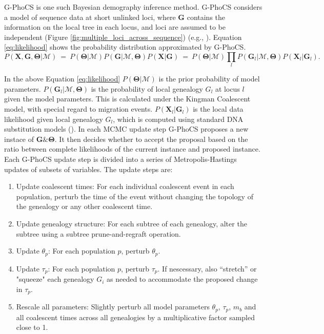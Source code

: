\documentclass[11pt]{article}
\newcommand{\vect}[1]{\boldsymbol{\mathbf{#1}}}
\newcommand{\X}{\vect{X}}
\newcommand{\M}{\mathcal{M}}
\newcommand{\G}{\vect{G}}
\newcommand{\T}{\vect{\Theta}}
\newcommand{\1}{\mathbbm{1}}
\newcommand{\gp}{G-PhoCS }
\begin{document}
\gp is one such Bayesian demography inference method. \gp considers a model of sequence data at short unlinked loci, where $\G$ contains the information on the local tree in each locus, and loci are assumed to be independent (Figure \ref{fig:multiple_loci_across_sequence}) (e.g., \cite{NIELWAKE01,RANNYANG03,GRONETAL11}).
Equation \ref{eq:likelihood} shows the probability distribution approximated by G-PhoCS.
%
\begin{equation}\label{eq:likelihood}
 P(\X,\G,\T|\M) ~=~ P(\T|\M) P(\G|\M,\T) P(\X|\G) ~=~ P(\T|\M) \prod_l P(\G_l|\M,\T) P(\X_l|\G_l).
\end{equation}

In the above Equation \ref{eq:likelihood} $P(\T|\M)$ is the prior probability of model parameters. $P(\G_l|\M,\T)$ is the probability of local genealogy $G_l$ at locus $l$ given the model parameters. This is calculated under the Kingman Coalescent model, with special regard to migration events. $P(\X_l|\G_l)$ is the local data likelihood given local genealogy $G_l$, which is computed using standard DNA substitution models (\cite{JUKECANT69}).
%
In each MCMC update step \gp proposes a new instace of $\G \& \T$. It then decides whether to accept the proposal based on the ratio between complete likelihoods of the current instance and proposed instance.
%
Each \gp update step is divided into a series of
Metropolis-Hastings updates of subsets of variables. The update steps are:

\begin{enumerate}
\item Update coalescent times: For each individual coalescent event in each population, perturb the time of the event without changing the topology of the genealogy or any other coalescent time. 

\item Update genealogy structure: For each subtree of each genealogy, alter the subtree using a subtree prune-and-regraft operation. 

\item Update $\theta_p$: For each population $p$, perturb $\theta_p$.

\item Update $\tau_p$: For each population $p$, perturb $\tau_p$. If nescessary, also “stretch” or "squeeze" each genealogy $G_i$ as needed to accommodate the proposed change in $\tau_p$. 
%

\item Rescale all parameters: Slightly perturb all model parameters ${\theta_p}$, ${\tau_p}$, ${m_b}$ and all coalescent
times across all genealogies by a multiplicative factor sampled close to 1.

\end{enumerate}
\end{document}
